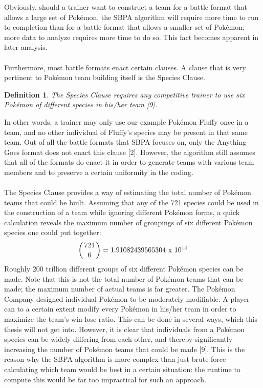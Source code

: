 \documentclass{article}
\newtheorem{definition}{Definition}
\begin{document}
Obviously, should a trainer want to construct a team for a battle format that allows a large set of Pok\'emon, the SBPA algorithm will require more time to run to completion than for a battle format that allows a smaller set of Pok\'emon; more data to analyze requires more time to do so. This fact becomes apparent in later analysis.\\\\
Furthermore, most battle formats enact certain clauses. A clause that is very pertinent to Pok\'emon team building itself is the Species Clause.
\begin{definition}\label{SpeciesClause}
	The Species Clause requires any competitive trainer to use six Pok\'emon of different species in his/her team [9].
\end{definition}
In other words, a trainer may only use our example Pok\'emon Fluffy once in a team, and no other individual of Fluffy's species may be present in that same team. Out of all the battle formats that SBPA focuses on, only the Anything Goes format does not enact this clause [2]. However, the algorithm still assumes that all of the formats do enact it in order to generate teams with various team members and to preserve a certain uniformity in the coding.\\\\
The Species Clause provides a way of estimating the total number of Pok\'emon teams that could be built. Assuming that any of the 721 species could be used in the construction of a team while ignoring different Pok\'emon forms, a quick calculation reveals the maximum number of groupings of six different Pok\'emon species one could put together:
\begin{equation*}
	\left({721 \above 0pt 6}\right)=1.91082439565304\text{ x }10^{14}
\end{equation*}
Roughly 200 trillion different groups of six different Pok\'emon species can be made. Note that this is not the total number of Pok\'emon teams that can be made; the maximum number of actual teams is far greater. The Pok\'emon Company designed individual Pok\'emon to be moderately modifiable. A player can to a certain extent modify every Pok\'emon in his/her team in order to maximize the team's win-lose ratio. This can be done in several ways, which this thesis will not get into. However, it is clear that individuals from a Pok\'emon species can be widely differing from each other, and thereby significantly increasing the number of Pok\'emon teams that could be made [9]. This is the reason why the SBPA algorithm is more complex than just brute-force calculating which team would be best in a certain situation: the runtime to compute this would be far too impractical for such an approach.\\\\
\end{document}
